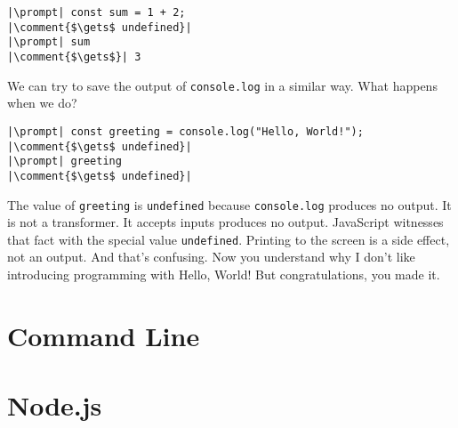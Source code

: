 \suppresslinenumbers
\begin{lstlisting}[escapeinside=||]
|\prompt| const sum = 1 + 2;
|\comment{$\gets$ undefined}|
|\prompt| sum
|\comment{$\gets$}| 3
\end{lstlisting}

We can try to save the output of \texttt{console.log} in a similar way. What happens when we do?

\begin{lstlisting}[escapeinside=||]
|\prompt| const greeting = console.log("Hello, World!");
|\comment{$\gets$ undefined}|
|\prompt| greeting
|\comment{$\gets$ undefined}|
\end{lstlisting}

The value of \texttt{greeting} is \texttt{undefined} because \texttt{console.log} produces no output. It is not a transformer. It accepts inputs produces no output. JavaScript witnesses that fact with the special value \texttt{undefined}. Printing to the screen is a side effect, not an output. And that's confusing. Now you understand why I don't like introducing programming with Hello, World! But congratulations, you made it.

\section{Command Line}

\section{Node.js}
